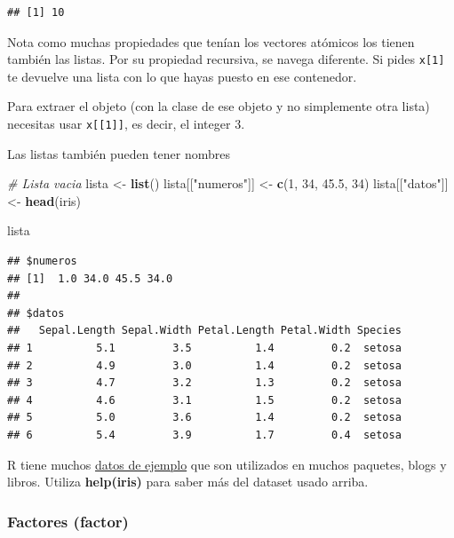 \documentclass[]{article}
\newenvironment{Shaded}{\begin{snugshade}}{\end{snugshade}}
\newcommand{\KeywordTok}[1]{\textcolor[rgb]{0.13,0.29,0.53}{\textbf{{#1}}}}
\newcommand{\DecValTok}[1]{\textcolor[rgb]{0.00,0.00,0.81}{{#1}}}
\newcommand{\FloatTok}[1]{\textcolor[rgb]{0.00,0.00,0.81}{{#1}}}
\newcommand{\StringTok}[1]{\textcolor[rgb]{0.31,0.60,0.02}{{#1}}}
\newcommand{\CommentTok}[1]{\textcolor[rgb]{0.56,0.35,0.01}{\textit{{#1}}}}
\newcommand{\NormalTok}[1]{{#1}}
\begin{document}
\begin{verbatim}
## [1] 10
\end{verbatim}

Nota como muchas propiedades que tenían los vectores atómicos los tienen
también las listas. Por su propiedad recursiva, se navega diferente. Si
pides \texttt{x{[}1{]}} te devuelve una lista con lo que hayas puesto en
ese contenedor.

Para extraer el objeto (con la clase de ese objeto y no simplemente otra
lista) necesitas usar \texttt{x{[}{[}1{]}{]}}, es decir, el integer 3.

Las listas también pueden tener nombres

\begin{Shaded}
\begin{Highlighting}[]
\CommentTok{# Lista vacia}
\NormalTok{lista <-}\StringTok{ }\KeywordTok{list}\NormalTok{()}
\NormalTok{lista[[}\StringTok{"numeros"}\NormalTok{]] <-}\StringTok{ }\KeywordTok{c}\NormalTok{(}\DecValTok{1}\NormalTok{, }\DecValTok{34}\NormalTok{, }\FloatTok{45.5}\NormalTok{, }\DecValTok{34}\NormalTok{) }
\NormalTok{lista[[}\StringTok{"datos"}\NormalTok{]] <-}\StringTok{ }\KeywordTok{head}\NormalTok{(iris)}

\NormalTok{lista}
\end{Highlighting}
\end{Shaded}

\begin{verbatim}
## $numeros
## [1]  1.0 34.0 45.5 34.0
## 
## $datos
##   Sepal.Length Sepal.Width Petal.Length Petal.Width Species
## 1          5.1         3.5          1.4         0.2  setosa
## 2          4.9         3.0          1.4         0.2  setosa
## 3          4.7         3.2          1.3         0.2  setosa
## 4          4.6         3.1          1.5         0.2  setosa
## 5          5.0         3.6          1.4         0.2  setosa
## 6          5.4         3.9          1.7         0.4  setosa
\end{verbatim}

\begin{curiosidad}
R tiene muchos \href{https://stat.ethz.ch/R-manual/R-devel/library/datasets/html/00Index.html}{datos de ejemplo}
que son utilizados en muchos paquetes, blogs y libros. Utiliza {\bf help(iris)} para
saber más del dataset usado arriba.
\end{curiosidad}

\subsubsection{Factores (factor)}\label{factores-factor}
\end{document}
